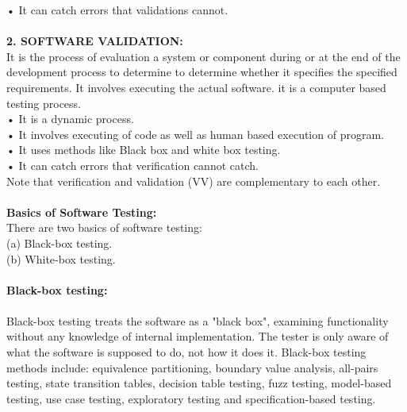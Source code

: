 \documentclass[11pt,a4paper]{report}
\begin{document}
•	It can catch errors that validations cannot.\\

\textbf{\\2. SOFTWARE VALIDATION:\\}
It is the process of evaluation a system or component during or at the end of the development process to determine to determine whether it specifies the specified requirements. It involves executing the actual software. it is a computer based testing process.\\

•	 It is a dynamic process.\\

•	 It involves executing of code as well as human based execution of program.\\

•	It uses methods like Black box and white box testing.\\

•	It can catch errors that verification cannot catch.\\

Note that verification and validation (VV) are complementary to each other.\\
\textbf{\\Basics of Software Testing:\\}
There are two basics of software testing:\\

(a) Black-box testing.\\

(b) White-box testing.\\

\textbf{\\Black-box testing:\\}
\paragraph{}Black-box testing treats the software as a "black box", examining functionality without any knowledge of internal implementation. The tester is only aware of what the software is supposed to do, not how it does it. Black-box testing methods include: equivalence partitioning, boundary value analysis, all-pairs testing, state transition tables, decision table testing, fuzz testing, model-based testing, use case testing, exploratory testing and specification-based testing.\\
\end{document}
